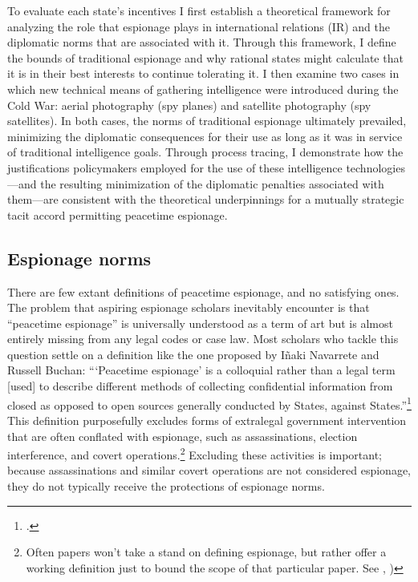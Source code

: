 \documentclass[14pt]{extarticle}
\begin{document}
To evaluate each state's incentives I first establish a theoretical framework for analyzing the role that espionage plays in international relations (IR) and the diplomatic norms that are associated with it. Through this framework, I define the bounds of traditional espionage and why rational states might calculate that it is in their best interests to continue tolerating it. I then examine two cases in which new technical means of gathering intelligence were introduced during the Cold War: aerial photography (spy planes) and satellite photography (spy satellites). In both cases, the norms of traditional espionage ultimately prevailed, minimizing the diplomatic consequences for their use as long as it was in service of traditional intelligence goals. Through process tracing, I demonstrate how the justifications policymakers employed for the use of these intelligence technologies---and the resulting minimization of the diplomatic penalties associated with them---are consistent with the theoretical underpinnings for a mutually strategic tacit accord permitting peacetime espionage.


\subsection{Espionage norms}
There are few extant definitions of peacetime espionage, and no satisfying ones. The problem that aspiring espionage scholars inevitably encounter is that \enquote{peacetime espionage} is universally understood as a term of art but is almost entirely missing from any legal codes or case law. Most scholars who tackle this question settle on a definition like the one proposed by I\~{n}aki Navarrete and Russell Buchan: \enquote{\enquote{Peacetime espionage} is a colloquial rather than a legal term [used] to describe different methods of collecting confidential information from closed as opposed to open sources \textelp{} generally conducted by States, against States.}\footcite[p.~901-902]{navarrete_out_2019} This definition purposefully excludes forms of extralegal government intervention that are often conflated with espionage, such as assassinations, election interference, and covert operations.\footnote{Often papers won't take a stand on defining espionage, but rather offer a working definition just to bound the scope of that particular paper. See \cite[p.~600]{radsan_unresolved_2007}, \cite[p.~2]{kapp_spying_2007})} Excluding these activities is important; because assassinations and similar covert operations are not considered espionage, they do not typically receive the protections of espionage norms.
\end{document}
